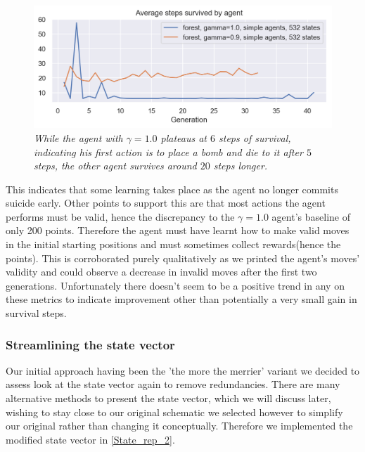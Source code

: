 \begin{figure}[!h]
\centering
	\includegraphics[width=\linewidth]{images/forest09_vs_forest1ste.png}
	\caption{\textit{While the agent with $\gamma = 1.0$ plateaus at $6$ steps of survival, indicating his first action is to place a bomb and die to it after $5$ steps, the other agent survives around $20$ steps longer.}}
	\label{forest09_vs_forest1ste}
\end{figure}

This indicates that some learning takes place as the agent no longer commits suicide early. Other points to support this are that most actions the agent performs must be valid, hence the discrepancy to the $\gamma = 1.0$ agent's baseline of only 200 points. Therefore the agent must have learnt how to make valid moves in the initial starting positions and must sometimes collect rewards(hence the points). This is corroborated purely qualitatively as we printed the agent's moves' validity and could observe a decrease in invalid moves after the first two generations. Unfortunately there doesn't seem to be a positive trend in any on these metrics to indicate improvement other than potentially a very small gain in survival steps.

\subsubsection{Streamlining the state vector}
Our initial approach having been the 'the more the merrier' variant we decided to assess look at the state vector again to remove redundancies. There are many alternative methods to present the state vector, which we will discuss later, wishing to stay close to our original schematic we selected however to simplify our original rather than changing it conceptually. Therefore we implemented the modified state vector in \ref{State_rep_2}.

